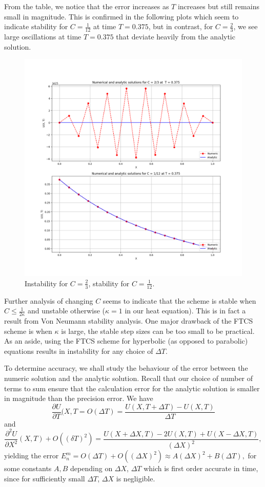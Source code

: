 \documentclass{article}
\newcommand{\pder}[2][]{\frac{\partial#1}{\partial#2}}
\newcommand{\spder}[2][]{\frac{\partial^2#1}{\partial#2^2}}
\begin{document}
From the table, we notice that the error increases as \(T\) increases but still remains small in magnitude. This is confirmed in the following plots which seem to indicate stability for \(C = \frac{1}{12}\) at time \(T = 0.375\), but in contrast, for \(C = \frac{2}{3}\), we see large oscillations at  time \(T = 0.375\) that deviate heavily from the analytic solution. 

\begin{figure}
    \centering
    \includegraphics[width=1.0\linewidth]{images/heat_instable.png}
    \caption{Instability for \(C = \frac{2}{3}\), stability for \(C = \frac{1}{12}.\)}
    \label{fig:enter-label}
\end{figure}

Further analysis of changing \(C\) seems to indicate that the scheme is stable when \(C \leq \frac{1}{2\kappa}\) and unstable otherwise (\(\kappa = 1\) in our heat equation). This is in fact a result from Von Neumann stability analysis. One major drawback of the FTCS scheme is when \(\kappa\) is large, the stable step sizes can be too small to be practical. As an aside, using the FTCS scheme for hyperbolic (as opposed to parabolic) equations results in instability for any choice of \(\Delta T\).

To determine accuracy, we shall study the behaviour of the error between the numeric solution and the analytic solution. Recall that our choice of number of terms to sum ensure that the calculation error for the analytic solution is smaller in magnitude than the precision error. We have
\[ \pder[U]{T}(X, T = O(\Delta T) = \frac{U(X, T + \Delta T) - U(X,T)}{\Delta T} \]
and
\[ \spder[U]{X}(X, T) + O((\delta T)^2) = \frac{U(X + \Delta X, T) - 2U(X, T) + U(X - \Delta X, T)}{(\Delta X)^2}, \]
yielding the error 
\(E_n^m = O(\Delta T) + O((\Delta X)^2) \approx A(\Delta X)^2 + B(\Delta T), \)
for some constants \(A, B\) depending on \(\Delta X\), \(\Delta T\) which is first order accurate in time, since for sufficiently small \(\Delta T\), \(\Delta X\) is negligible. 
\end{document}
